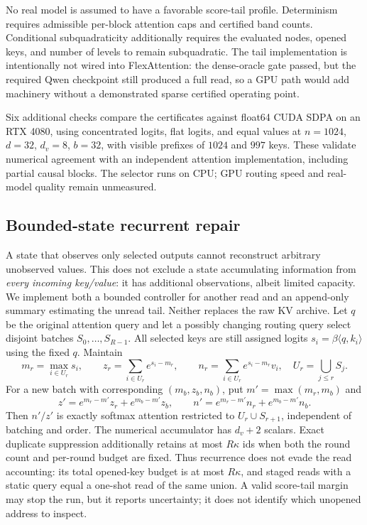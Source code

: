 \documentclass[11pt]{article}
\numberwithin{equation}{section}
\newcommand{\inner}[2]{\langle #1, #2\rangle}
\begin{document}
No real model is assumed to have a favorable score-tail profile. Determinism requires admissible per-block
attention caps and certified band counts. Conditional subquadraticity additionally requires the evaluated
nodes, opened keys, and number of levels to remain subquadratic. The tail implementation is intentionally not
wired into FlexAttention: the dense-oracle gate passed, but the required Qwen checkpoint still produced a
full read, so a GPU path would add machinery without a demonstrated sparse certified operating point.

Six additional checks compare the certificates against
float64 CUDA SDPA on an RTX 4080, using concentrated logits, flat logits, and equal values at
$n=1024$, $d=32$, $d_v=8$, $b=32$, with visible prefixes of $1024$ and $997$ keys.
These validate numerical agreement with an independent attention implementation, including partial
causal blocks. The selector runs on CPU; GPU routing speed and real-model quality remain unmeasured.

\subsection{Bounded-state recurrent repair}

A state that observes only selected outputs cannot reconstruct arbitrary unobserved values. This does not
exclude a state accumulating information from \emph{every incoming key/value}: it has additional observations,
albeit limited capacity. We implement both a bounded controller for another read and an append-only summary
estimating the unread tail. Neither replaces the raw KV archive.
Let $q$ be the original attention query and let a possibly changing routing query select disjoint batches
$S_0,\ldots,S_{R-1}$. All selected keys are still assigned logits $s_i=\beta\inner{q}{k_i}$ using the fixed
$q$. Maintain
\begin{equation}\label{eq:repair-state}
m_r=\max_{i\in U_r}s_i,\qquad
z_r=\sum_{i\in U_r}e^{s_i-m_r},\qquad
n_r=\sum_{i\in U_r}e^{s_i-m_r}v_i,
\quad U_r=\bigcup_{j\le r}S_j.
\end{equation}
For a new batch with corresponding $(m_b,z_b,n_b)$, put $m'=\max(m_r,m_b)$ and
\begin{equation}\label{eq:repair-merge}
z'=e^{m_r-m'}z_r+e^{m_b-m'}z_b,
\qquad
n'=e^{m_r-m'}n_r+e^{m_b-m'}n_b.
\end{equation}
Then $n'/z'$ is exactly softmax attention restricted to $U_r\cup S_{r+1}$, independent of batching and
order. The numerical accumulator has $d_v+2$ scalars. Exact duplicate suppression additionally retains at
most $R\kappa$ ids when both the round count and per-round budget are fixed. Thus recurrence does not evade
the read accounting: its total opened-key budget is at most $R\kappa$, and staged reads with a static query
equal a one-shot read of the same union. A valid score-tail margin may stop the run, but it reports uncertainty;
it does not identify which unopened address to inspect.
\end{document}
